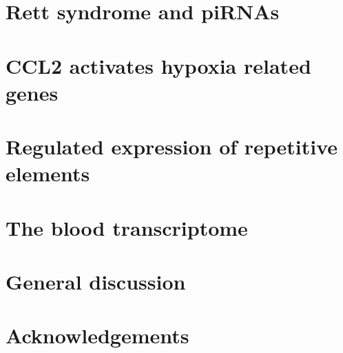 \documentclass[10pt,a4paper]{report}
\begin{document}
\chapter{Rett syndrome and piRNAs}\label{pirna}



\chapter{CCL2 activates hypoxia related genes}\label{ccl2}



\chapter{Regulated expression of repetitive elements}\label{repeat}


\chapter{The blood transcriptome}\label{blood}


%

\chapter{General discussion}


\chapter*{Acknowledgements}




\end{document}
